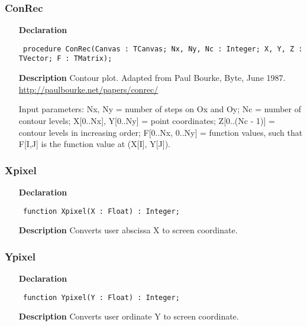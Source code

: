\documentclass[12pt,a4paper,oneside]{report}
\newcommand{\declarationitem}[1]{\textbf{#1}}
\newcommand{\descriptiontitle}[1]{\textbf{#1}}
\newcommand{\code}[1]{\texttt{#1}}
\begin{document}
\subsubsection{ConRec}
\label{uwinplot-ConRec}
\begin{itemize}\item[\declarationitem{Declaration}\hfill]
	\begin{flushleft}
		\code{
			procedure ConRec(Canvas : TCanvas; Nx, Ny, Nc : Integer; X, Y, Z : TVector; F : TMatrix);}
		
	\end{flushleft}
	
	\par
	\item[\descriptiontitle{Description}]
	Contour plot. Adapted from Paul Bourke, Byte, June 1987.\\ \href{http://paulbourke.net/papers/conrec/}{http://paulbourke.net/papers/conrec/}
	
	Input parameters: Nx, Ny = number of steps on Ox and Oy; Nc = number of contour levels; X[0..Nx], Y[0..Ny] = point coordinates; Z[0..(Nc {-} 1)] = contour levels in increasing order; F[0..Nx, 0..Ny] = function values, such that F[I,J] is the function value at (X[I], Y[J]).
	
\end{itemize}
\subsubsection{Xpixel}
\label{uwinplot-Xpixel}
\begin{itemize}\item[\declarationitem{Declaration}\hfill]
	\begin{flushleft}
		\code{
			function Xpixel(X : Float) : Integer;}
		
	\end{flushleft}
	
	\par
	\item[\descriptiontitle{Description}]
	Converts user abscissa X to screen coordinate.
	
\end{itemize}
\subsubsection{Ypixel}
\label{uwinplot-Ypixel}
\begin{itemize}\item[\declarationitem{Declaration}\hfill]
	\begin{flushleft}
		\code{
			function Ypixel(Y : Float) : Integer;}
		
	\end{flushleft}
	
	\par
	\item[\descriptiontitle{Description}]
	Converts user ordinate Y to screen coordinate.
	
\end{itemize}
\end{document}
